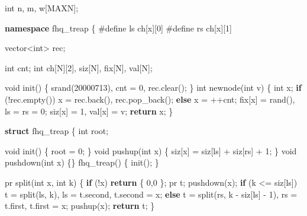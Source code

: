 \documentclass[
]{article}
\newenvironment{Shaded}{}{}
\newcommand{\ControlFlowTok}[1]{\textcolor[rgb]{0.00,0.44,0.13}{\textbf{#1}}}
\newcommand{\DataTypeTok}[1]{\textcolor[rgb]{0.56,0.13,0.00}{#1}}
\newcommand{\DecValTok}[1]{\textcolor[rgb]{0.25,0.63,0.44}{#1}}
\newcommand{\KeywordTok}[1]{\textcolor[rgb]{0.00,0.44,0.13}{\textbf{#1}}}
\newcommand{\NormalTok}[1]{#1}
\newcommand{\PreprocessorTok}[1]{\textcolor[rgb]{0.74,0.48,0.00}{#1}}
\begin{document}
\begin{Shaded}
\begin{Highlighting}[]
\DataTypeTok{int}\NormalTok{ n, m, w[MAXN];}

\KeywordTok{namespace}\NormalTok{ fhq\_treap}
\NormalTok{\{}
\PreprocessorTok{\#define ls }\NormalTok{ch[x][}\DecValTok{0}\NormalTok{]}
\PreprocessorTok{\#define rs }\NormalTok{ch[x][}\DecValTok{1}\NormalTok{]}

\NormalTok{    vector\textless{}}\DataTypeTok{int}\NormalTok{\textgreater{} rec;}

    \DataTypeTok{int}\NormalTok{ cnt;}
    \DataTypeTok{int}\NormalTok{ ch[N][}\DecValTok{2}\NormalTok{], siz[N], fix[N], val[N];}

    \DataTypeTok{void}\NormalTok{ init() \{ srand(}\DecValTok{20000713}\NormalTok{), cnt = }\DecValTok{0}\NormalTok{, rec.clear(); \}}
    \DataTypeTok{int}\NormalTok{ newnode(}\DataTypeTok{int}\NormalTok{ v)}
\NormalTok{    \{}
        \DataTypeTok{int}\NormalTok{ x;}
        \ControlFlowTok{if}\NormalTok{ (!rec.empty()) x = rec.back(), rec.pop\_back();}
        \ControlFlowTok{else}\NormalTok{ x = ++cnt;}
\NormalTok{        fix[x] = rand(), ls = rs = }\DecValTok{0}\NormalTok{;}
\NormalTok{        siz[x] = }\DecValTok{1}\NormalTok{, val[x] = v;}
        \ControlFlowTok{return}\NormalTok{ x;}
\NormalTok{    \}}

    \KeywordTok{struct}\NormalTok{ fhq\_treap}
\NormalTok{    \{}
        \DataTypeTok{int}\NormalTok{ root;}

        \DataTypeTok{void}\NormalTok{ init() \{ root = }\DecValTok{0}\NormalTok{; \}}
        \DataTypeTok{void}\NormalTok{ pushup(}\DataTypeTok{int}\NormalTok{ x) \{ siz[x] = siz[ls] + siz[rs] + }\DecValTok{1}\NormalTok{; \}}
        \DataTypeTok{void}\NormalTok{ pushdown(}\DataTypeTok{int}\NormalTok{ x) \{\}}
\NormalTok{        fhq\_treap() \{ init(); \}}

\NormalTok{        pr split(}\DataTypeTok{int}\NormalTok{ x, }\DataTypeTok{int}\NormalTok{ k)}
\NormalTok{        \{}
            \ControlFlowTok{if}\NormalTok{ (!x) }\ControlFlowTok{return}\NormalTok{ \{ }\DecValTok{0}\NormalTok{,}\DecValTok{0}\NormalTok{ \};}
\NormalTok{            pr t; pushdown(x);}
            \ControlFlowTok{if}\NormalTok{ (k \textless{}= siz[ls]) t = split(ls, k), ls = t.second, t.second = x;}
            \ControlFlowTok{else}\NormalTok{ t = split(rs, k {-} siz[ls] {-} }\DecValTok{1}\NormalTok{), rs = t.first, t.first = x;}
\NormalTok{            pushup(x); }\ControlFlowTok{return}\NormalTok{ t;}
\NormalTok{        \}}


\end{Highlighting}
\end{Shaded}
\end{document}

